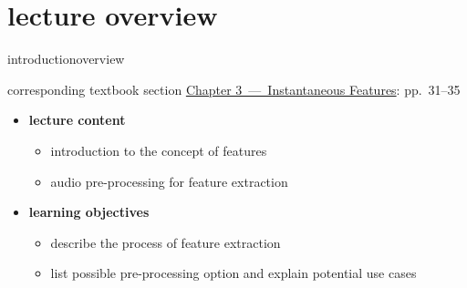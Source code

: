 




\subtitle{Module 3.0: Feature Extraction~---~Introduction and Pre-processing}


	

    \section[overview]{lecture overview}
        \begin{frame}{introduction}{overview}
            \begin{block}{corresponding textbook section}
                    \href{http://ieeexplore.ieee.org/xpl/articleDetails.jsp?arnumber=6331120}{Chapter 3~---~Instantaneous Features}: pp.~31--35
            \end{block}

            \begin{itemize}
                \item   \textbf{lecture content}
                    \begin{itemize}
                        \item   introduction to the concept of features
                        \item   audio pre-processing for feature extraction
                    \end{itemize}
                \bigskip
                \item<2->   \textbf{learning objectives}
                    \begin{itemize}
                        \item   describe the process of feature extraction
                        \item   list possible pre-processing option and explain potential use cases
                    \end{itemize}
            \end{itemize}
        \end{frame}

